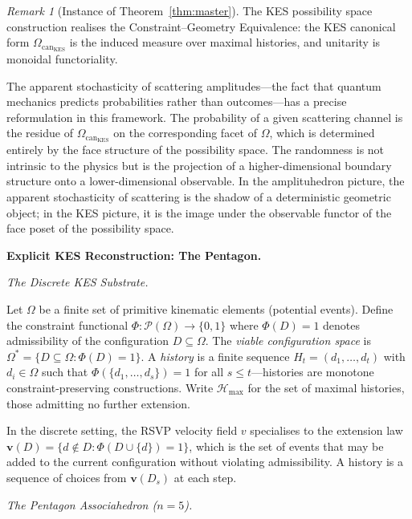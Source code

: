 \documentclass[11pt]{article}
\theoremstyle{plain}
\theoremstyle{definition}
\theoremstyle{remark}
\newtheorem{remark}[theorem]{Remark}
\newcommand{\Phif}{\Phi}
\newcommand{\vf}{v}
\newcommand{\OmKS}{\Omega}
\newcommand{\CF}{\Omega_{\mathrm{can}}}
\newcommand{\Hmax}{\mathcal{H}_{\max}}
\begin{document}
\begin{remark}[Instance of Theorem~\ref{thm:master}]
The KES possibility space construction realises the Constraint--Geometry Equivalence: the KES canonical form $\CF_{\mathrm{KES}}$ is the induced measure over maximal histories, and unitarity is monoidal functoriality.
\end{remark}

The apparent stochasticity of scattering amplitudes---the fact that quantum mechanics predicts probabilities rather than outcomes---has a precise reformulation in this framework. The probability of a given scattering channel is the residue of $\CF_{\mathrm{KES}}$ on the corresponding facet of $\OmKS$, which is determined entirely by the face structure of the possibility space. The randomness is not intrinsic to the physics but is the projection of a higher-dimensional boundary structure onto a lower-dimensional observable. In the amplituhedron picture, the apparent stochasticity of scattering is the shadow of a deterministic geometric object; in the KES picture, it is the image under the observable functor of the face poset of the possibility space.

\bigskip\noindent\textbf{Explicit KES Reconstruction: The Pentagon.}
\label{sec:discrete}

\medskip\noindent\textit{The Discrete KES Substrate.}

Let $\OmKS$ be a finite set of primitive kinematic elements (potential events). Define the constraint functional $\Phif: \mathcal{P}(\OmKS) \to \{0,1\}$ where $\Phif(D) = 1$ denotes admissibility of the configuration $D \subseteq \OmKS$. The \emph{viable configuration space} is $\OmKS^* = \{D \subseteq \OmKS : \Phif(D) = 1\}$. A \emph{history} is a finite sequence $H_t = (d_1, \ldots, d_t)$ with $d_i \in \OmKS$ such that $\Phif(\{d_1, \ldots, d_s\}) = 1$ for all $s \leq t$---histories are monotone constraint-preserving constructions. Write $\Hmax$ for the set of maximal histories, those admitting no further extension.

In the discrete setting, the RSVP velocity field $\vf$ specialises to the extension law $\mathbf{v}(D) = \{d \notin D : \Phif(D \cup \{d\}) = 1\}$, which is the set of events that may be added to the current configuration without violating admissibility. A history is a sequence of choices from $\mathbf{v}(D_s)$ at each step.

\medskip\noindent\textit{The Pentagon Associahedron ($n = 5$).}
\end{document}
